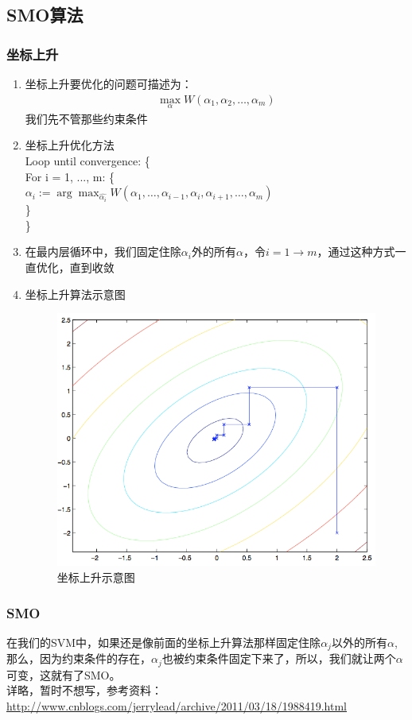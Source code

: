 \subsection{SMO算法}

\subsubsection{坐标上升}
\begin{enumerate}
	\item 坐标上升要优化的问题可描述为：
	\begin{align}
		\max_{\alpha}W(\alpha_1, \alpha_2, \dots, \alpha_m)
	\end{align}
	我们先不管那些约束条件
	\item 坐标上升优化方法 \\ 
	Loop until convergence: \{ \\
		For i = 1, ..., m: \{ \\
			$\alpha_i := \arg \max_{\hat{\alpha_i}}W(\alpha_1, \dots, \alpha_{i-1}, \alpha_i, \alpha_{i+1}, \dots, \alpha_m)$ \\
		\} \\
	\} 
	\item 在最内层循环中，我们固定住除$\alpha_i$外的所有$\alpha$，令$i=1 \to m$，通过这种方式一直优化，直到收敛
	\item 坐标上升算法示意图
	\begin{figure}[htbp]
		\centering
		\includegraphics[scale=0.8]{./images/坐标上升}
		\caption{坐标上升示意图}
	\end{figure}
\end{enumerate}


\subsubsection{SMO}
在我们的SVM中，如果还是像前面的坐标上升算法那样固定住除$\alpha_j$以外的所有$\alpha$,那么，因为约束条件的存在，$\alpha_j$也被约束条件固定下来了，所以，我们就让两个$\alpha$可变，这就有了SMO。\\
详略，暂时不想写，参考资料：\url{http://www.cnblogs.com/jerrylead/archive/2011/03/18/1988419.html}
